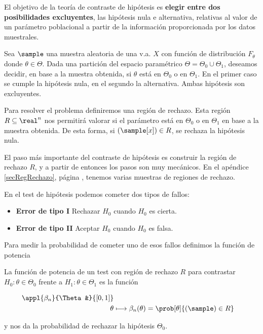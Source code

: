\documentclass{apuntes}
\begin{document}
El objetivo de la teoría de contraste de hipótesis es \textbf{elegir entre dos posibilidades excluyentes}, las hipótesis nula e alternativa, relativas al valor de un parámetro poblacional a partir de la información proporcionada por los datos muestrales.

Sea $\sample$ una muestra aleatoria de una v.a. $X$ con función de distribución $F_\theta$ donde $\theta \in \Theta$. Dada una partición del espacio paramétrico $\Theta=\Theta_0 \cup \Theta_1$, deseamos decidir, en base a la muestra obtenida, si $\theta$ está en $\Theta_0$ o en $\Theta_1$. En el primer caso se cumple la hipótesis nula, en el segundo la alternativa. Ambas hipótesis son excluyentes.

Para resolver el problema definiremos una región de rechazo. Esta región $R\subseteq\real^n$ nos permitirá valorar si el parámetro está en $\Theta_0$ o en $\Theta_1$ en base a la muestra obtenida. De esta forma, si $(\sample[x]) \in R$, se rechaza la hipótesis nula.

El paso más importante del contraste de hipótesis es construir la región de rechazo $R$, y a partir de entonces los pasos son muy mecánicos. En el apéndice \ref{secRegRechazo}, página \pageref{secRegRechazo}, tenemos varias muestras de regiones de rechazo.

En el test de hipótesis podemos cometer dos tipos de fallos:

\begin{itemize}
\item \textbf{Error de tipo I} Rechazar $H_0$ cuando $H_0$ es cierta.\label{errorTipoI}
\item \textbf{Error de tipo II} Aceptar $H_0$ cuando $H_0$ es falsa.\label{errorTipoII}
\end{itemize}

Para medir la probabilidad de cometer uno de esos fallos definimos la función de potencia

\begin{defn} La función de potencia de un test con región de rechazo $R$ para contrastar $H_0: \theta \in \Theta_0$ frente a $H_1:\theta \in \Theta_1$ es la función

\begin{align*}
\appl{\beta_n}{\Theta&}{[0,1]} \\
\theta&\longmapsto \beta_n(\theta) = \prob[\theta]	{(\sample) \in R}
\end{align*}

y nos da la probabilidad de rechazar la hipótesis $\Theta_0$.\label{defFuncPotencia}
\end{defn}
\end{document}
